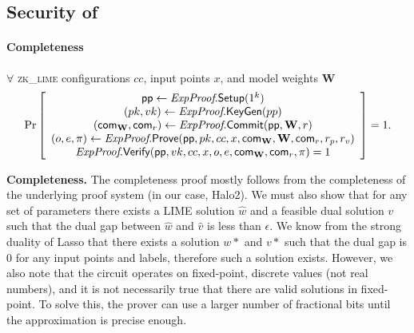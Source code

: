 \subsection{Security of \name} \label{app:subsec:secproof}

\paragraph{Completeness}
$\forall $ \textsc{zk\_lime} configurations $cc$, input points $x$, and model weights $\mathbf{W}$\\
\[
\operatorname{Pr}
\left[
\begin{array}{c}
\textsf{pp} \gets \textit{ExpProof}.\textsf{Setup}(1^k) \\
(pk, vk) \gets \textit{ExpProof}.\textsf{KeyGen}(pp) \\
(\textsf{com}_{\mathbf{W}}, \textsf{com}_{r}) \leftarrow \textit{ExpProof}.\textsf{Commit}(\textsf{pp},\mathbf{W}, r)\\
(o,e,\pi)\leftarrow\textit{ExpProof}.\textsf{Prove}(\textsf{pp}, pk, cc, x, \textsf{com}_\mathbf{W},\mathbf{W},\textsf{com}_r,r_p, r_v)\\
\textit{ExpProof}.\textsf{Verify}(\textsf{pp}, vk, cc, x, o, e, \textsf{com}_{\mathbf{W}}, \textsf{com}_r,\pi)=1
\end{array}
\right] = 1.
\]

\begin{proofs}
\par
\textbf{Completeness.}
The completeness proof mostly follows from the completeness of the underlying proof system (in our case, Halo2). We must also show that for any set of parameters there exists a LIME solution $\hat{w}$ and a feasible dual solution $v$ such that the dual gap between $\hat{w}$ and $\hat{v}$ is less than $\epsilon$. We know from the strong duality of Lasso that there exists a solution $w*$ and $v*$ such that the dual gap is 0 for any input points and labels, therefore such a solution exists. However, we also note that the circuit operates on fixed-point, discrete values (not real numbers), and it is not necessarily true that there are valid solutions in fixed-point. To solve this, the prover can use a larger number of fractional bits until the approximation is precise enough.
\end{proofs}

